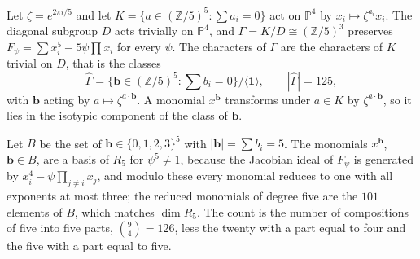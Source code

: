 \documentclass[11pt]{amsart}
\theoremstyle{definition}
\theoremstyle{remark}
\newcommand{\Z}{\mathbb{Z}}
\newcommand{\PP}{\mathbb{P}}
\newcommand{\bb}{\mathbf{b}}
\newcommand{\one}{\mathbf{1}}
\begin{document}
Let $\zeta=e^{2\pi i/5}$ and let $K=\{a\in(\Z/5)^5:\sum a_i=0\}$ act on
$\PP^4$ by $x_i\mapsto\zeta^{a_i}x_i$. The diagonal subgroup $D$ acts
trivially on $\PP^4$, and $\Gamma=K/D\cong(\Z/5)^3$ preserves $F_\psi=
\sum x_i^5-5\psi\prod x_i$ for every $\psi$. The characters of $\Gamma$ are
the characters of $K$ trivial on $D$, that is the classes
\[
\widehat\Gamma=\{\bb\in(\Z/5)^5:\textstyle\sum b_i=0\}/\langle\one\rangle,
\qquad |\widehat\Gamma|=125,
\]
with $\bb$ acting by $a\mapsto\zeta^{a\cdot\bb}$. A monomial $x^{\bb}$
transforms under $a\in K$ by $\zeta^{a\cdot\bb}$, so it lies in the isotypic
component of the class of $\bb$.

Let $B$ be the set of $\bb\in\{0,1,2,3\}^5$ with $|\bb|=\sum b_i=5$. The
monomials $x^{\bb}$, $\bb\in B$, are a basis of $R_5$ for $\psi^5\ne1$,
because the Jacobian ideal of $F_\psi$ is generated by $x_i^4-\psi\prod_{j
\ne i}x_j$, and modulo these every monomial reduces to one with all
exponents at most three; the reduced monomials of degree five are the
$101$ elements of $B$, which matches $\dim R_5$. The count is the number of
compositions of five into five parts, $\binom94=126$, less the twenty with
a part equal to four and the five with a part equal to five.
\end{document}
